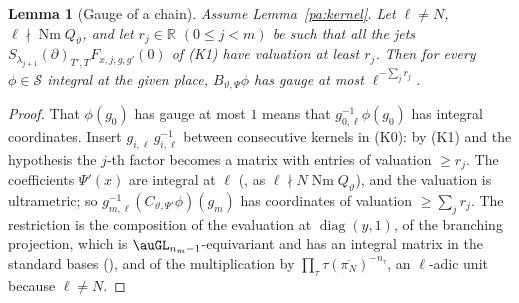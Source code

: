 \documentclass[10pt]{amsart}
\newtheorem{lemma}[theorem]{Lemma}
\theoremstyle{definition}
\theoremstyle{remark}
\newcommand{\R}{\mathbb R}
\providecommand{\auNm}{\operatorname{Nm}}
\providecommand{\auS}{\mathcal S}
\providecommand{\aubar}[1]{\overline{#1}}
\begin{document}
\begin{lemma}[Gauge of a chain]\label{pa:chain}
Assume Lemma~\ref{pa:kernel}. Let $\ell\ne N$, $\ell\nmid\auNm Q_\vartheta$, and let $r_j\in\R$
$(0\le j<m)$ be such that all the jets $S_{\lambda_{j+1}}(\partial)_{T',T}F_{x,j,g,g'}(0)$ of (K1)
have valuation at least $r_j$. Then for every $\phi\in\auS$ integral at the given place,
$B_{\vartheta,\Psi}\phi$ has gauge at most $\ell^{-\sum_jr_j}$.
\end{lemma}
\begin{proof}
That $\phi(g_0)$ has gauge at most $1$ means that $g_{0,\ell}^{-1}\phi(g_0)$ has integral
coordinates. Insert $g_{i,\ell}\,g_{i,\ell}^{-1}$ between consecutive kernels in (K0): by (K1) and
the hypothesis the $j$-th factor becomes a matrix with entries of valuation $\ge r_j$. The
coefficients $\Psi'(x)$ are integral at $\ell$ ({\cite[Proposition~14.25]{P46}}, as $\ell\nmid
N\auNm Q_\vartheta$), and the valuation is ultrametric; so $g_{m,\ell}^{-1}(C_{\vartheta,\Psi'}
\phi)(g_m)$ has coordinates of valuation $\ge\sum_jr_j$. The restriction is the composition of the
evaluation at $\operatorname{diag}(y,1)$, of the branching projection, which is
$\auGL_{n_m-1}$-equivariant and has an integral matrix in the standard bases
({\cite[Proposition~14.24]{P46}}), and of the multiplication by $\prod_\tau\tau(\aubar{\pi_N})^{-
n_\tau}$, an $\ell$-adic unit because $\ell\ne N$.
\end{proof}
\end{document}
